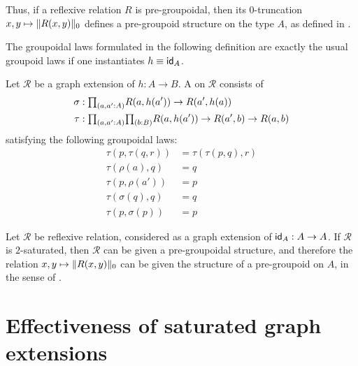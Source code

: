 Thus, if a reflexive relation $R$ is pre-groupoidal, then its $0$-truncation $x,y\mapsto\trunc{0}{R(x,y)}$ defines a pre-groupoid structure on the type $A$, as defined in \cite{AhrensKapulkinShulman}. 

The groupoidal laws formulated in the following definition are exactly the usual groupoid laws if one instantiates $h\jdeq \idfunc[A]$. 

\begin{defn}
Let $\mathcal{R}$ be a graph extension of $h:A\to B$. A  on $\mathcal{R}$ consists of
\begin{align*}
\sigma & : \prd{a,a':A} R(a,h(a'))\to R(a',h(a)) \\
\tau & : \prd{a,a':A}{b:B} R(a,h(a'))\to R(a',b)\to R(a,b)
\end{align*}
satisfying the following groupoidal laws:
\begin{align*}
\tau(p,\tau(q,r)) & =\tau(\tau(p,q),r) \tag{associativity}\\
\tau(\rho(a),q) & =q \tag{left unit law}\\
\tau(p,\rho(a')) & =p \tag{right unit law}\\
\tau(\sigma(q),q) & =q \tag{left inverse law}\\
\tau(p,\sigma(p)) & =p \tag{right inverse law}
\end{align*}
\end{defn}

\begin{prp}
Let $\mathcal{R}$ be reflexive relation, considered as a graph extension of $\idfunc[A]:A\to A$. If $\mathcal{R}$ is $2$-saturated, then $\mathcal{R}$ can be given a pre-groupoidal structure, and therefore the relation $x,y\mapsto \trunc{0}{R(x,y)}$ can be given the structure of a pre-groupoid on $A$, in the sense of \cite{AhrensKapulkinShulman}.
\end{prp}

\section{Effectiveness of saturated graph extensions}

